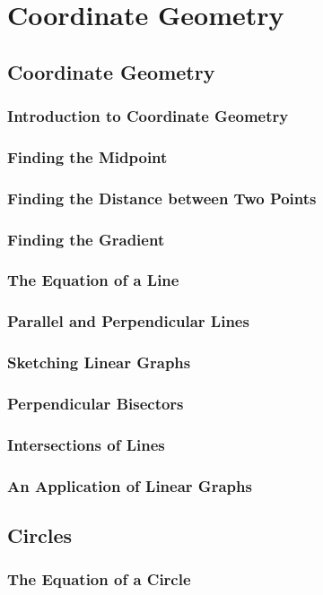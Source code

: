 \documentclass[../alevelmaths.tex]{subfiles}
\begin{document}
\chapter{Coordinate Geometry}
\section{Coordinate Geometry}
\subsection*{Introduction to Coordinate Geometry}
\subsection*{Finding the Midpoint}
\subsection*{Finding the Distance between Two Points}
\subsection*{Finding the Gradient}
\subsection*{The Equation of a Line}
\subsection*{Parallel and Perpendicular Lines}
\subsection*{Sketching Linear Graphs}
\subsection*{Perpendicular Bisectors}
\subsection*{Intersections of Lines}
\subsection*{An Application of Linear Graphs}
\section{Circles}
\subsection*{The Equation of a Circle}
\end{document}
